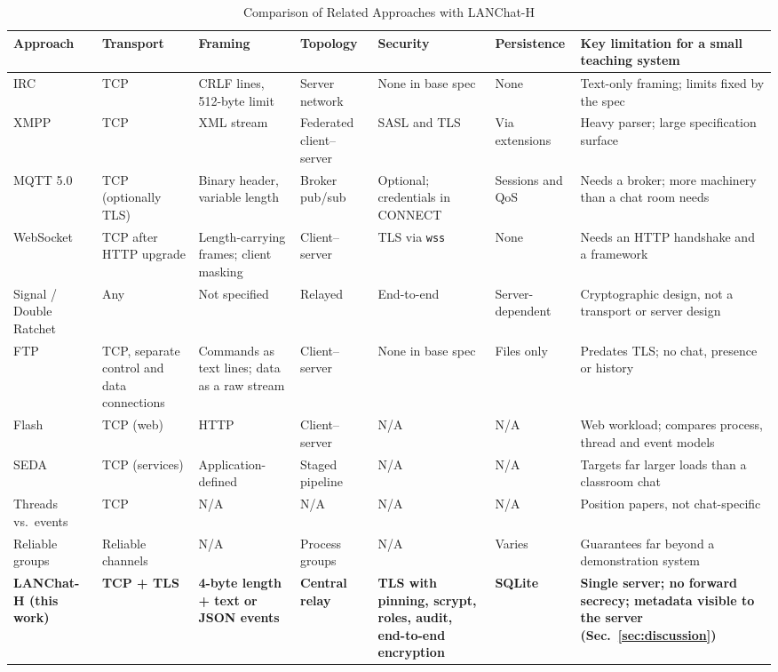 \documentclass[conference]{IEEEtran}
\newcommand{\code}[1]{\texttt{#1}}
\begin{document}
\begin{table}[t]
\centering
\caption{Comparison of Related Approaches with LANChat-H}
\label{tab:comparison}
\scriptsize
\renewcommand{\arraystretch}{1.1}
\begin{tabularx}{\textwidth}{@{}>{\raggedright\arraybackslash}p{2.6cm} Y Y Y Y Y Y@{}}
\toprule
\textbf{Approach} & \textbf{Transport} & \textbf{Framing} & \textbf{Topology} & \textbf{Security} & \textbf{Persistence} & \textbf{Key limitation for a small teaching system} \\
\midrule
IRC \cite{rfc1459,rfc2812} & TCP & CRLF lines, 512-byte limit & Server network & None in base spec & None & Text-only framing; limits fixed by the spec \\
XMPP \cite{rfc6120,rfc6121} & TCP & XML stream & Federated client--server & SASL and TLS & Via extensions & Heavy parser; large specification surface \\
MQTT 5.0 \cite{mqtt5} & TCP (optionally TLS) & Binary header, variable length & Broker pub/sub & Optional; credentials in CONNECT & Sessions and QoS & Needs a broker; more machinery than a chat room needs \\
WebSocket \cite{rfc6455} & TCP after HTTP upgrade & Length-carrying frames; client masking & Client--server & TLS via \code{wss} & None & Needs an HTTP handshake and a framework \\
Signal / Double Ratchet \cite{signal,cohngordon} & Any & Not specified & Relayed & End-to-end & Server-dependent & Cryptographic design, not a transport or server design \\
FTP \cite{rfc959} & TCP, separate control and data connections & Commands as text lines; data as a raw stream & Client--server & None in base spec & Files only & Predates TLS; no chat, presence or history \\
Flash \cite{flash} & TCP (web) & HTTP & Client--server & N/A & N/A & Web workload; compares process, thread and event models \\
SEDA \cite{seda} & TCP (services) & Application-defined & Staged pipeline & N/A & N/A & Targets far larger loads than a classroom chat \\
Threads vs.\ events \cite{ousterhout,vonbehren,krohn} & TCP & N/A & N/A & N/A & N/A & Position papers, not chat-specific \\
Reliable groups \cite{birman87,birman93} & Reliable channels & N/A & Process groups & N/A & Varies & Guarantees far beyond a demonstration system \\
\textbf{LANChat-H (this work)} & \textbf{TCP + TLS} & \textbf{4-byte length + text or JSON events} & \textbf{Central relay} & \textbf{TLS with pinning, scrypt, roles, audit, end-to-end encryption} & \textbf{SQLite} & \textbf{Single server; no forward secrecy; metadata visible to the server (Sec.~\ref{sec:discussion})} \\
\bottomrule
\end{tabularx}
\end{table}
\end{document}
